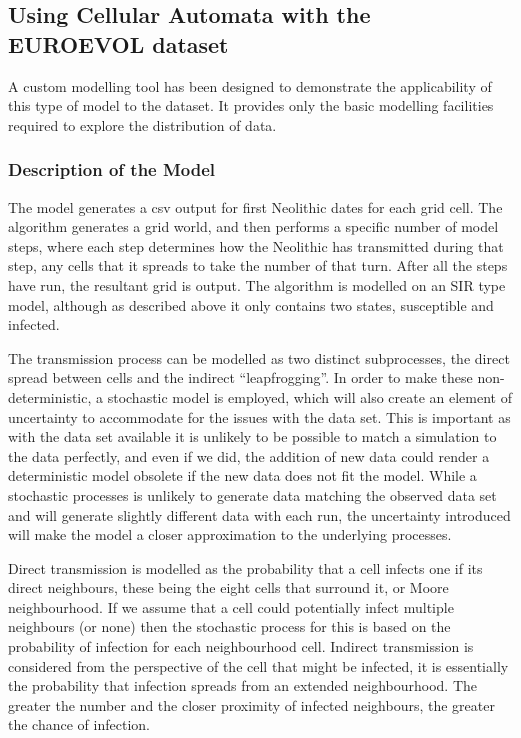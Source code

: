 \subsection{Using Cellular Automata with the EUROEVOL dataset}
A custom modelling tool \citep{doug_cowie_2018_1297319} has been designed to demonstrate the applicability of this type of model to the dataset. It provides only the basic modelling facilities required to explore the distribution of data. 

\subsubsection{Description of the Model}
The model generates a csv output for first Neolithic dates for each grid cell. The algorithm generates a grid world, and then performs a specific number of model steps, where each step determines how the Neolithic has transmitted during that step, any cells that it spreads to take the number of that turn. After all the steps have run, the resultant grid is output. The algorithm is modelled on an SIR type model, although as described above it only contains two states, susceptible and infected.

The transmission process can be modelled as two distinct subprocesses, the direct spread between cells and the indirect ``leapfrogging''. In order to make these non-deterministic, a stochastic model is employed, which will also create an element of uncertainty to accommodate for the issues with the data set. This is important as with the data set available it is unlikely to be possible to match a simulation to the data perfectly, and even if we did, the addition of new data could render a deterministic model obsolete if the new data does not fit the model. While a stochastic processes is unlikely to generate data matching the observed data set and will generate slightly different data with each run, the uncertainty introduced will make the model a closer approximation to the underlying processes.

Direct transmission is modelled as the probability that a cell infects one if its direct neighbours, these being the eight cells that surround it, or Moore neighbourhood. If we assume that a cell could potentially infect multiple neighbours (or none) then the stochastic process for this is based on the probability of infection for each neighbourhood cell. Indirect transmission is considered from the perspective of the cell that might be infected, it is essentially the probability that infection spreads from an extended neighbourhood. The greater the number and the closer proximity of infected neighbours, the greater the chance of infection. 

